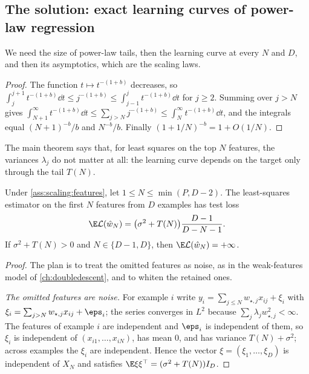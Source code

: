 \begin{refsection}
\section{The solution: exact learning curves of power-law regression}\label{sec:scaling:regression}

We need the size of power-law tails, then the learning curve at every $N$ and $D$, and then its asymptotics, which are the scaling laws.


\begin{proof}
The function $t\mapsto t^{-(1+b)}$ decreases, so $\int_j^{j+1}t^{-(1+b)}\dd t\le j^{-(1+b)}\le\int_{j-1}^jt^{-(1+b)}\dd t$ for $j\ge2$. Summing over $j>N$ gives $\int_{N+1}^\infty t^{-(1+b)}\dd t\le\sum_{j>N}j^{-(1+b)}\le\int_N^\infty t^{-(1+b)}\dd t$, and the integrals equal $(N+1)^{-b}/b$ and $N^{-b}/b$. Finally $(1+1/N)^{-b}=1+O(1/N)$.
\end{proof}

The main theorem says that, for least squares on the top $N$ features, the variances $\lambda_j$ do not matter at all: the learning curve depends on the target only through the tail $T(N)$.

\begin{theorem}\label{thm:scaling:exact}
Under \cref{ass:scaling:features}, let $1\le N\le\min(P,D-2)$. The least-squares estimator on the first $N$ features from $D$ examples has test loss
\begin{equation}\label{eq:scaling:exact}
  \E\Loss(\hat w_N)=\bigl(\sigma^2+T(N)\bigr)\frac{D-1}{D-N-1} .
\end{equation}
If $\sigma^2+T(N)>0$ and $N\in\{D-1,D\}$, then $\E\Loss(\hat w_N)=+\infty$.
\end{theorem}

\begin{proof}
The plan is to treat the omitted features as noise, as in the weak-features model of \cref{ch:doubledescent}, and to whiten the retained ones.

\emph{The omitted features are noise.} For example $i$ write $y_i=\sum_{j\le N}w_{\star,j}x_{ij}+\xi_i$ with $\xi_i=\sum_{j>N}w_{\star,j}x_{ij}+\eps_i$; the series converges in $L^2$ because $\sum_j\lambda_jw_{\star,j}^2<\infty$. The features of example $i$ are independent and $\eps_i$ is independent of them, so $\xi_i$ is independent of $(x_{i1},\dots,x_{iN})$, has mean $0$, and has variance $T(N)+\sigma^2$; across examples the $\xi_i$ are independent. Hence the vector $\xi=(\xi_1,\dots,\xi_D)$ is independent of $X_N$ and satisfies $\E\xi\xi^\top=(\sigma^2+T(N))I_D$.


\end{proof}
\end{refsection}
